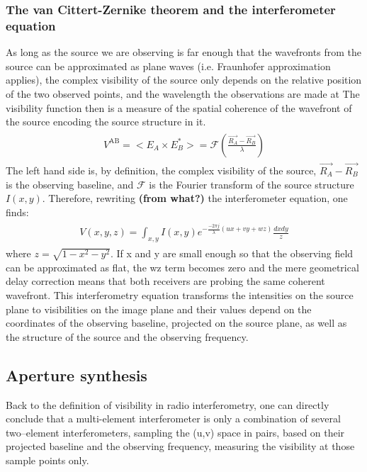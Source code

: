 \documentclass[paper=a4, fontsize=11pt]{scrartcl} %
\numberwithin{equation}{section} %
\numberwithin{figure}{section} %
\numberwithin{table}{section} %
\begin{document}
\subsubsection*{The van Cittert-Zernike theorem and the interferometer equation}
As long as the source we are observing is far enough that the wavefronts from the source can be approximated as plane waves (i.e. Fraunhofer approximation applies), the complex visibility of the source only depends on the relative position of the two observed points, and the wavelength the observations are made at The visibility function then is a measure of the spatial coherence of the wavefront of the source encoding the source structure in it.
\begin{align} 
\begin{split}
\label{eq:vC-Z}
V^\mathrm{AB} = <E_A \times E_B^*> = \mathcal{F}(\frac{\vec{R_A} - \vec{R_B}}{\lambda})
\end{split}                    
\end{align}
The left hand side is, by definition, the complex visibility of the source, $\vec{R_A} - \vec{R_B}$ is the observing baseline, and $\mathcal{F}$ is the Fourier transform of the source structure $I(x,y)$. Therefore, rewriting {\bf (from what?)} the interferometer equation, one finds:
\begin{align} 
\begin{split}
\label{eq:InterferometerEq}
V(x,y,z) = \int_{x,y} I(x,y) e^{-\frac{-2\pi j}{\lambda}(ux+vy+wz)} \frac{dx dy}{z}
\end{split}                    
\end{align}
where $z=\sqrt{1-x^2-y^2}$. If x and y are small enough so that the observing field can be approximated as flat, the wz term becomes zero and the mere geometrical delay correction means that both receivers are probing the same coherent wavefront. This interferometry equation transforms the intensities on the source plane to visibilities on the image plane and their values depend on the coordinates of the observing baseline, projected on the source plane, as well as the structure of the source and the observing frequency. 

\subsection{Aperture synthesis}
Back to the definition of visibility in radio interferometry, one can directly conclude that a multi-element interferometer is only a combination of several two--element interferometers, sampling the (u,v) space in pairs, based on their projected baseline and the observing frequency, measuring the visibility at those sample points only. 
\end{document}
